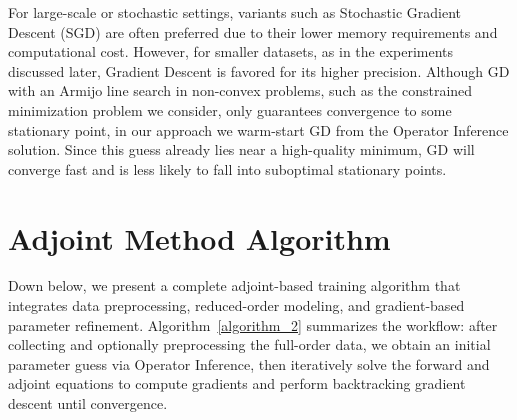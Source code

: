 For large-scale or stochastic settings, variants such as Stochastic Gradient Descent (SGD) are often preferred \cite{ruder2017overviewgradientdescentoptimization} due to their lower memory requirements and computational cost. However, for smaller datasets, as in the experiments discussed later, Gradient Descent is favored for its higher precision. Although GD with an Armijo line search in non-convex problems, such as the constrained minimization problem we consider, only guarantees convergence to some stationary point, in our approach we warm-start GD from the Operator Inference solution. Since this guess already lies near a high-quality minimum, GD will converge fast and is less likely to fall into suboptimal stationary points.



\section{Adjoint Method Algorithm}

Down below, we present a complete adjoint-based training algorithm that integrates data preprocessing, reduced-order modeling, and gradient-based parameter refinement. Algorithm~\ref{algorithm_2} summarizes the workflow: after collecting and optionally preprocessing the full-order data, we obtain an initial parameter guess via Operator Inference, then iteratively solve the forward and adjoint equations to compute gradients and perform backtracking gradient descent until convergence.

